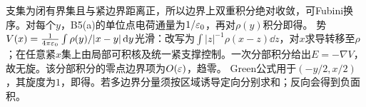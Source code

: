\documentclass[UTF8,fontset=fandol,11pt]{ctexart}
\begin{document}
支集为闭有界集且与紧边界距离正，所以边界上双重积分绝对收敛，可Fubini换序。对每个$y$，B5(a)的单位点电荷通量为$1/\varepsilon_0$，再对$\rho(y)$积分即得。
势$V(x)=\frac1{4\pi\varepsilon_0}\int\rho(y)/|x-y|\,\mathrm d y$光滑：改写为$\int|z|^{-1}\rho(x-z)\dd z$，对$x$求导转移至$\rho$；在任意紧$x$集上由局部可积核及统一紧支撑控制。一次分部积分给出$E=-\nabla V$，故无旋。该分部积分的零点边界项为$O(\varepsilon)$，趋零。
Green公式用于$(-y/2,x/2)$，其旋度为$1$，即得。若多边界分量须按区域诱导定向分别求和；反向会得到负面积。
\end{document}
